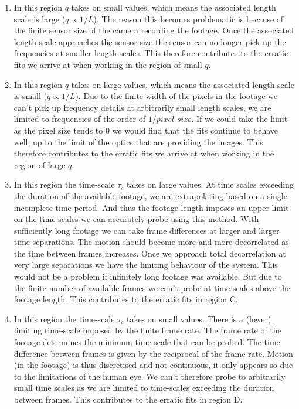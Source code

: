 \documentclass[10pt]{article}
\begin{document}
\begin{enumerate}[label=(\Alph*)]
\item In this region $q$ takes on small values, which means the associated length scale is large ($q \propto 1 / L$). The reason this becomes problematic is because of the finite sensor size of the camera recording the footage. Once the associated length scale approaches the sensor size the sensor can no longer pick up the frequencies at smaller length scales. This therefore contributes to the erratic fits we arrive at when working in the region of small $q$.
     
\item In this region $q$ takes on large values, which means the associated length scale is small ($q \propto 1 / L$). Due to the finite width of the pixels in the footage we can't pick up frequency details at arbitrarily small length scales, we are limited to frequencies of the order of $1 / pixel$ $size$. If we could take the limit as the pixel size tends to 0 we would find that the fits continue to behave well, up to the limit of the optics that are providing the images. This therefore contributes to the erratic fits we arrive at when working in the region of large $q$.

\item In this region the time-scale $\tau_c$ takes on large values. At time scales exceeding the duration of the available footage, we are extrapolating based on a single incomplete time period. And thus the footage length imposes an upper limit on the time scales we can accurately probe using this method. With sufficiently long footage we can take frame differences at larger and larger time separations. The motion should become more and more decorrelated as the time between frames increases. Once we approach total decorrelation at very large separations we have the limiting behaviour of the system. This would not be a problem if infinitely long footage was available. But due to the finite number of available frames we can't probe at time scales above the footage length. This contributes to the erratic fits in region C.

\item In this region the time-scale $\tau_c$ takes on small values. There is a (lower) limiting time-scale imposed by the finite frame rate. The frame rate of the footage determines the minimum time scale that can be probed. The time difference between frames is given by the reciprocal of the frame rate. Motion (in the footage) is thus discretised and not continuous, it only appears so due to the limitations of the human eye. We can't therefore probe to arbitrarily small time scales as we are limited to time-scales exceeding the duration between frames. This contributes to the erratic fits in region D.


\end{enumerate}
\end{document}
